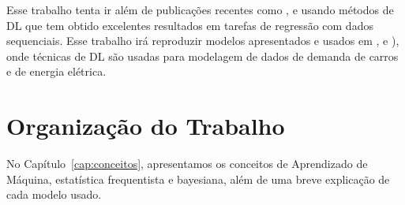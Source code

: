 Esse trabalho tenta ir além de publicações recentes como \citet{cementnn1},
\citet{cementnn2} e \citet{cementml} usando métodos de DL que tem
obtido excelentes resultados em tarefas de
regressão com dados sequenciais. Esse trabalho irá reproduzir modelos
apresentados e usados em \cite{ubertime}, \cite{lstmbr} e \cite{energylstm}), onde
técnicas de DL são usadas para modelagem de dados de demanda de carros e de energia elétrica. 

\section{Organização do Trabalho}
\label{sec:organizacao_trabalho}

No Capítulo~\ref{cap:conceitos}, apresentamos os conceitos de Aprendizado de
Máquina, estatística frequentista e bayesiana, além de uma breve explicação
de cada modelo usado. 



